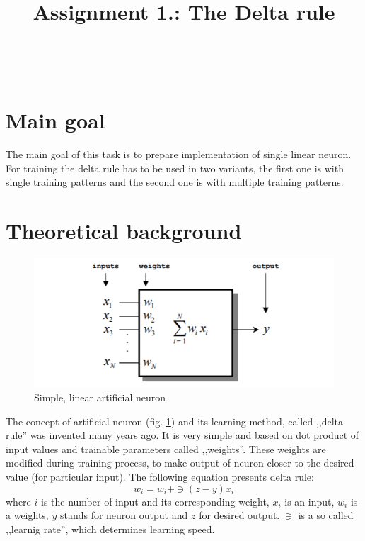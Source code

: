 \documentclass{classrep}
\author{%
    \studentinfo[239671@edu.p.lodz.pl]{Jan Karwowski}{239671}\\
    \studentinfo[239676@edu.p.lodz.pl]{Kamil Kowalewski}{239676}\\
}
\title{Assignment 1.: The Delta rule}
\begin{document}
    \maketitle
    \thispagestyle{fancyplain}

    \tableofcontents
    \newpage

    \section{Main goal}
    \label{main_goal} {
        The main goal of this task is to prepare implementation of single linear neuron.
        For training the delta rule has to be used in two variants, the first one is
        with single training patterns and the second one is with multiple training
        patterns.
    }

    \section{Theoretical background}
    \label{theory} {
        \begin{figure}[!htbp]
            \centering
            \includegraphics[width=\textwidth]{img/linear_neuron.png}
            \caption{Simple, linear artificial neuron}
            \label{artificial_neuron}
        \end{figure}
        \FloatBarrier

        The concept of artificial neuron (fig. \ref{artificial_neuron}) and its
        learning method, called ,,delta rule'' was invented many years ago. It is very
        simple and based on dot product of input values and trainable parameters called
        ,,weights''. These weights are modified during training process, to make output
        of neuron closer to the desired value (for particular input). The following
        equation presents delta rule:
        \begin{equation}
            w_{i} = w_{i} + \ni (z - y) x_{i}
        \end{equation}
        where $i$ is the number of input and its corresponding weight, $x_i$ is an
        input, $w_i$ is a weights, $y$ stands for neuron output and $z$ for desired
        output. $\ni$ is a so called ,,learnig rate'', which determines learning speed.
    }
\end{document}
